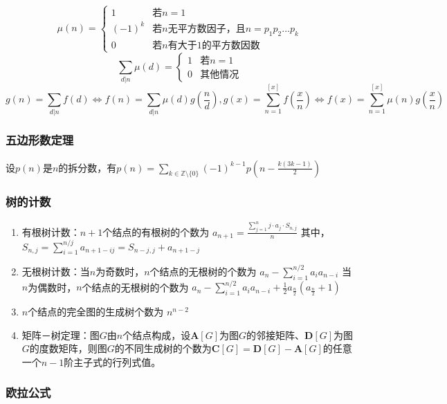 \documentclass[landscape,a4paper]{article}
\begin{document}
\begin{spacing}{0.3}
\begin{multicols}{2}
$$\mu(n) = \begin{cases}
	1 & \text{若}n=1\\
	(-1)^k & \text{若}n\text{无平方数因子，且}n = p_1p_2\dots p_k\\
	0 & \text{若}n\text{有大于}1\text{的平方数因数}
\end{cases}$$
$$\sum_{d|n}{\mu(d)} = \begin{cases}
	1 & \text{若}n=1\\
	0 & \text{其他情况}
\end{cases}$$
$$g(n) = \sum_{d|n}{f(d)} \Leftrightarrow f(n) = \sum_{d|n}{\mu(d)g(\frac{n}{d})}
,       g(x) = \sum_{n=1}^{[x]}f(\frac{x}{n}) \Leftrightarrow f(x) = \sum_{n=1}^{[x]}{\mu(n)g(\frac{x}{n})}$$

\subsubsection{五边形数定理}

设$p(n)$是$n$的拆分数，有$p(n) = \sum_{k \in \mathbb{Z} \setminus \{0\}} (-1)^{k - 1} p\left(n - \frac{k(3k - 1)}{2}\right)$

\subsubsection{树的计数}

\begin{enumerate}
	\item 有根树计数：$n+1$个结点的有根树的个数为
		$a_{n+1} = \frac{\sum_{j=1}^{n}{j \cdot a_j \cdot{S_{n, j}}}}{n}$
	其中，
		$S_{n, j} = \sum_{i=1}^{n/j}{a_{n+1-ij}} = S_{n-j, j} + a_{n+1-j}$
	\item 无根树计数：当$n$为奇数时，$n$个结点的无根树的个数为
		$a_n-\sum_{i=1}^{n/2}{a_ia_{n-i}}$
	当$n$为偶数时，$n$个结点的无根树的个数为
		$a_n-\sum_{i=1}^{n/2}{a_ia_{n-i}}+\frac{1}{2}a_{\frac{n}{2}}(a_{\frac{n}{2}}+1)$
	\item $n$个结点的完全图的生成树个数为
		$n^{n-2}$
	\item 矩阵－树定理：图$G$由$n$个结点构成，设$\bm{A}[G]$为图$G$的邻接矩阵、$\bm{D}[G]$为图$G$的度数矩阵，则图$G$的不同生成树的个数为$\bm{C}[G] = \bm{D}[G] - \bm{A}[G]$的任意一个$n-1$阶主子式的行列式值。
\end{enumerate}

\subsubsection{欧拉公式}


\end{multicols}
\end{spacing}
\end{document}

